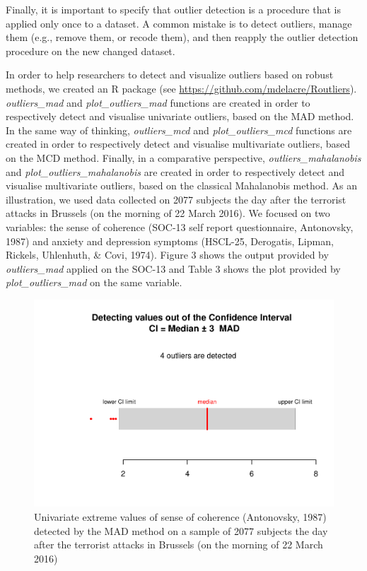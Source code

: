 \documentclass[man,floatsintext]{apa6}
\begin{document}
Finally, it is important to specify that outlier detection is a procedure that is applied only once to a dataset. A common mistake is to detect outliers, manage them (e.g., remove them, or recode them), and then reapply the outlier detection procedure on the new changed dataset.

In order to help researchers to detect and visualize outliers based on robust methods, we created an R package (see \url{https://github.com/mdelacre/Routliers}). \emph{outliers\_mad} and \emph{plot\_outliers\_mad} functions are created in order to respectively detect and visualise univariate outliers, based on the MAD method. In the same way of thinking, \emph{outliers\_mcd} and \emph{plot\_outliers\_mcd} functions are created in order to respectively detect and visualise multivariate outliers, based on the MCD method. Finally, in a comparative perspective, \emph{outliers\_mahalanobis} and \emph{plot\_outliers\_mahalanobis} are created in order to respectively detect and visualise multivariate outliers, based on the classical Mahalanobis method. As an illustration, we used data collected on 2077 subjects the day after the terrorist attacks in Brussels (on the morning of 22 March 2016). We focused on two variables: the sense of coherence (SOC-13 self report questionnaire, Antonovsky, 1987) and anxiety and depression symptoms (HSCL-25, Derogatis, Lipman, Rickels, Uhlenhuth, \& Covi, 1974). Figure 3 shows the output provided by \emph{outliers\_mad} applied on the SOC-13 and Table 3 shows the plot provided by \emph{plot\_outliers\_mad} on the same variable.

\begin{figure}
\centering
\includegraphics{Outliers_files/figure-latex/MADSOC-1.pdf}
\caption{\label{fig:MADSOC}Univariate extreme values of sense of coherence (Antonovsky, 1987) detected by the MAD method on a sample of 2077 subjects the day after the terrorist attacks in Brussels (on the morning of 22 March 2016)}
\end{figure}
\end{document}
